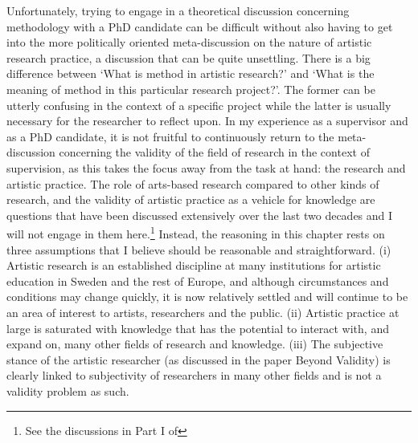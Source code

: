 \documentclass[12pt]{article}
\begin{document}
Unfortunately, trying to engage in a theoretical discussion concerning methodology with a PhD candidate can be difficult without also having to get into the more politically oriented meta-discussion on the nature of artistic research practice, a discussion that can be quite unsettling. There is a big difference between `What is method in artistic research?' and `What is the meaning of method in this particular research project?'. The former can be utterly confusing in the context of a specific project while the latter is usually necessary for the researcher to reflect upon. In my experience as a supervisor and as a PhD candidate, it is not fruitful to continuously return to the meta-discussion concerning the validity of the field of research in the context of supervision, as this takes the focus away from the task at hand: the research and artistic practice. The role of arts-based research compared to other kinds of research, and the validity of artistic practice as a vehicle for knowledge are questions that have been discussed extensively over the last two decades and I will not engage in them here.\footnote{See the discussions in Part I of } Instead, the reasoning in this chapter rests on three assumptions that I believe should be reasonable and straightforward. (i) Artistic research is an established discipline at many institutions for artistic education in Sweden and the rest of Europe, and although circumstances and conditions may change quickly, it is now relatively settled and will continue to be an area of interest to artists, researchers and the public. (ii) Artistic practice at large is saturated with knowledge that has the potential to interact with, and expand on, many other fields of research and knowledge. (iii) The subjective stance of the artistic researcher (as discussed in the paper Beyond Validity) is clearly linked to subjectivity of researchers in many other fields and is not a validity problem as such.
\end{document}
